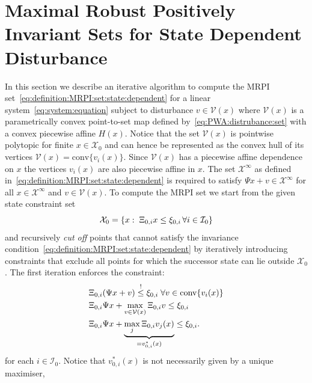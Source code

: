 \documentclass[letterpaper, 10pt, conference]{ieeeconf} %
\providecommand{\conv}{\text{conv}}
\begin{document}
\section{Maximal Robust Positively Invariant Sets for State Dependent Disturbance}\label{sec:state:dep:MRPI}
In this section we describe an iterative algorithm to compute the MRPI 
set~\eqref{eq:definition:MRPI:set:state:dependent} for a linear system~\eqref{eq:system:equation} subject to disturbance
$v\in\mathcal V(x)$ where $\mathcal V(x)$ is a parametrically convex point-to-set map defined 
by~\eqref{eq:PWA:distrubance:set} with a convex piecewise affine $H(x)$.
Notice that the set $\mathcal V(x)$ is pointwise polytopic 
for finite $x\in\mathcal X_0$ and can hence be represented as the 
convex hull of its vertices $\mathcal V(x) = \conv\{v_i(x)\}$. Since ${\mathcal{V}}(x)$
has a piecewise affine dependence on $x$ the vertices $v_i(x)$ are also piecewise affine in $x$.
The set $\mathcal X^\infty$ as defined in~\eqref{eq:definition:MRPI:set:state:dependent} 
is required to satisfy $\Psi x + v\in\mathcal X^\infty$ for all
$x\in\mathcal X^\infty$ and $v\in\mathcal V(x)$. To compute the MRPI set we start from the given 
state constraint set
\[
\mathcal X_0 = \{x:\;\Xi_{0,i}x\leq \xi_{0,i}\,\forall i\in\mathcal I_0\}
\]
and
recursively \emph{cut off} points that cannot satisfy the invariance condition~\eqref{eq:definition:MRPI:set:state:dependent}
by iteratively introducing
constraints that exclude all points for which the successor state can lie outside 
$\mathcal X_0$. The first iteration enforces the constraint:
%
\[%
\begin{split}
	&\genmat_{0,i}(\Psi x + v)\overset{!}{\leq}\genvec_{0,i}\;\forall v\in\conv\{v_i(x)\}\\
	&\genmat_{0,i}\Psi x + \max_{v\in\mathcal V(x)} \genmat_{0,i} v \leq \genvec_{0,i}\\
	&\genmat_{0,i}\Psi x + \underbrace{\max_{j} \genmat_{0,i} v_j(x)}_{=v_{0,i}^\ast(x)} \leq \genvec_{0,i}.
\end{split}
\]%
%
for each $i\in \mathcal I_0$.
Notice that $v_{0,i}^\ast(x)$ is not necessarily given by a unique maximiser, 
\end{document}

